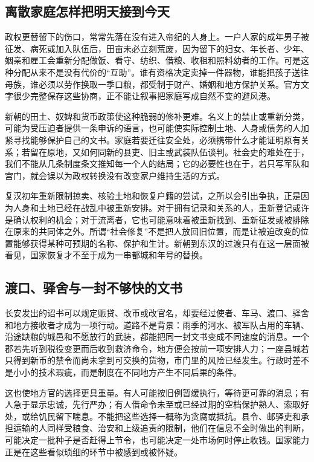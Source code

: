 \subsection{离散家庭怎样把明天接到今天}

政权更替留下的伤口，常常先落在没有进入帝纪的人身上。一户人家的成年男子被征发、病死或加入队伍后，田亩未必立刻荒废，因为留下的妇女、年长者、少年、姻亲和雇工会重新分配做饭、看守、纺织、借粮、收租和照料幼者的工作。可是这种分配从来不是没有代价的“互助”。谁有资格决定卖掉一件器物，谁能把孩子送往母族，谁必须以劳作换取一季口粮，都受制于财产、婚姻和地方保护关系。官方文字很少完整保存这些协商，正不能让叙事把家庭写成自然不变的避风港。

新朝的田土、奴婢和货币政策使这种脆弱的修补更难。名义上的禁止或重新分类，可能为受压迫者提供一条申诉的语言，也可能使实际控制土地、人身或债务的人加紧寻找能够保护自己的文书。家庭若要迁往安全处，必须携带什么才能证明原有关系；若留在原地，又如何同新的县吏、旧主或武装队伍谈判。社会史的难处在于，我们不能从几条制度条文推知每一个人的结局；它的必要性也在于，若只写军队和宫门，就会误以为政权转换没有改变家户维持生活的方式。

复汉初年重新限制掠卖、核验土地和恢复户籍的尝试，之所以会引出争执，正是因为人身和土地已经在战乱中被重新安排。对于拥有记录和关系的人，重新登记或许是确认权利的机会；对于流离者，它也可能意味着被重新找到、重新征发或被排除在原来的共同体之外。所谓“社会修复”不是把人放回旧位置，而是让被迫改变的位置能够获得某种可预期的名称、保护和生计。新朝到东汉的过渡只有在这一层面被看见，国家恢复才不至于成为一串都城和年号的替换。

\subsection{渡口、驿舍与一封不够快的文书}

长安发出的诏书可以规定赈贷、改币或改官名，却要经过使者、车马、渡口、驿舍和地方接收者才成为一项行动。道路不是背景：雨季的河水、被军队占用的车辆、沿途缺粮的城邑和不愿放行的武装，都能把同一封文书变成不同速度的消息。一个郡若先听到税役变更而后收到救济命令，地方便会按前一项安排人力；一座县城若只得到新币的禁令而尚未拿到可交换的货物，市门里的风险已经发生。行政时差不是小小的技术瑕疵，而是制度在不同地方产生不同后果的条件。

这也使地方官的选择更具重量。有人可能按旧例暂缓执行，等待更可靠的消息；有人急于显示忠诚，先行严办；有人借命令未至或已经过期的空档保护熟人、索取好处，或给饥民留下喘息。不能把这些选择一概称为贪腐或抵抗。县令、邮驿吏和承担运输的人同样受粮食、治安和上级追责的限制，他们在信息不全时做出的判断，可能决定一批种子是否赶得上节令，也可能决定一处市场何时停止收钱。国家能力正是在这些看似琐细的环节中被感到或被怀疑。

